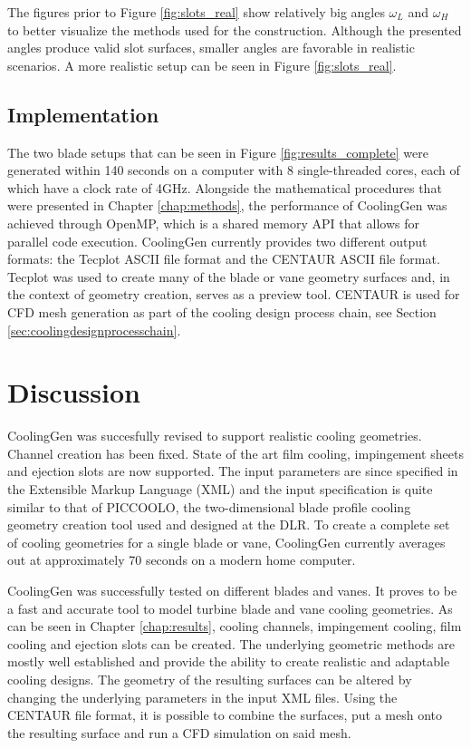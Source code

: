 \documentclass[a4paper, 11pt]{report}
\theoremstyle{definition}
\begin{document}
	The figures prior to Figure \ref{fig:slots_real} show relatively big angles $\omega_L$ and $\omega_H$ to better visualize the methods used for the construction. Although the presented angles produce valid slot surfaces, smaller angles are favorable in realistic scenarios. A more realistic setup can be seen in Figure \ref{fig:slots_real}.

\section{Implementation}\label{sec:implementation}
	The two blade setups that can be seen in Figure \ref{fig:results_complete} were generated within 140 seconds on a computer with 8 single-threaded cores, each of which have a clock rate of 4GHz. Alongside the mathematical procedures that were presented in Chapter \ref{chap:methods}, the performance of CoolingGen was achieved through OpenMP, which is a shared memory API that allows for parallel code execution. CoolingGen currently provides two different output formats: the Tecplot \cite{TecplotSoft} ASCII file format and the CENTAUR \cite{CENTAURSoft} ASCII file format. Tecplot was used to create many of the blade or vane geometry surfaces and, in the context of geometry creation, serves as a preview tool. CENTAUR is used for CFD mesh generation as part of the cooling design process chain, see Section \ref{sec:coolingdesignprocesschain}.

\chapter{Discussion}
	CoolingGen was succesfully revised to support realistic cooling geometries. Channel creation has been fixed. State of the art film cooling, impingement sheets and ejection slots are now supported. The input parameters are since specified in the Extensible Markup Language (XML) and the input specification is quite similar to that of PICCOOLO, the two-dimensional blade profile cooling geometry creation tool used and designed at the DLR. To create a complete set of cooling geometries for a single blade or vane, CoolingGen currently averages out at approximately 70 seconds on a modern home computer.

	CoolingGen was successfully tested on different blades and vanes. It proves to be a fast and accurate tool to model turbine blade and vane cooling geometries. As can be seen in Chapter \ref{chap:results}, cooling channels, impingement cooling, film cooling and ejection slots can be created. The underlying geometric methods are mostly well established and provide the ability to create realistic and adaptable cooling designs. The geometry of the resulting surfaces can be altered by changing the underlying parameters in the input XML files. Using the CENTAUR file format, it is possible to combine the surfaces, put a mesh onto the resulting surface and run a CFD simulation on said mesh.
\end{document}
